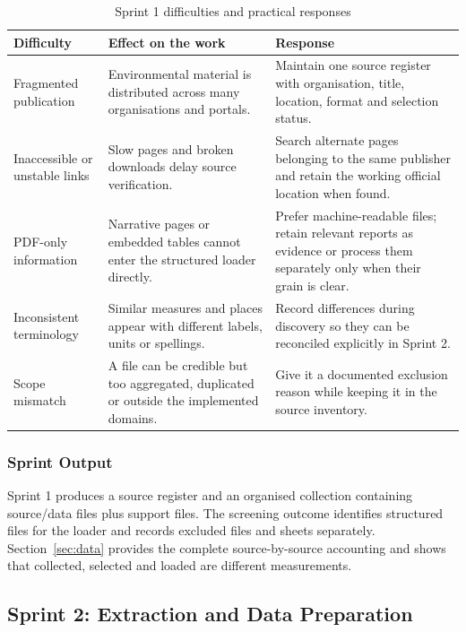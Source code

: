 \begin{table}[H]
\centering
\caption{Sprint 1 difficulties and practical responses}
\label{tab:sprint1-challenges}
\small
\begin{tabular}{L{0.20\textwidth}L{0.28\textwidth}L{0.42\textwidth}}
\toprule
Difficulty & Effect on the work & Response \\
\midrule
Fragmented publication & Environmental material is distributed across many
organisations and portals. & Maintain one source register with organisation,
title, location, format and selection status. \\
Inaccessible or unstable links & Slow pages and broken downloads delay source
verification. & Search alternate pages belonging to the same publisher and
retain the working official location when found. \\
PDF-only information & Narrative pages or embedded tables cannot enter the
structured loader directly. & Prefer machine-readable files; retain relevant
reports as evidence or process them separately only when their grain is clear. \\
Inconsistent terminology & Similar measures and places appear with different
labels, units or spellings. & Record differences during discovery so they can
be reconciled explicitly in Sprint 2. \\
Scope mismatch & A file can be credible but too aggregated, duplicated or
outside the implemented domains. & Give it a documented exclusion reason while
keeping it in the source inventory. \\
\bottomrule
\end{tabular}
\end{table}

\subsubsection{Sprint Output}

Sprint 1 produces a source register and an organised collection containing
\mSourceDataFiles{} source/data files plus \mSupportFiles{} support files. The
screening outcome identifies \mSourceFiles{} structured files for the loader
and records excluded files and sheets separately. Section~\ref{sec:data}
provides the complete source-by-source accounting and shows that collected,
selected and loaded are different measurements.

\subsection{Sprint 2: Extraction and Data Preparation}
\label{subsec:sprint2}

